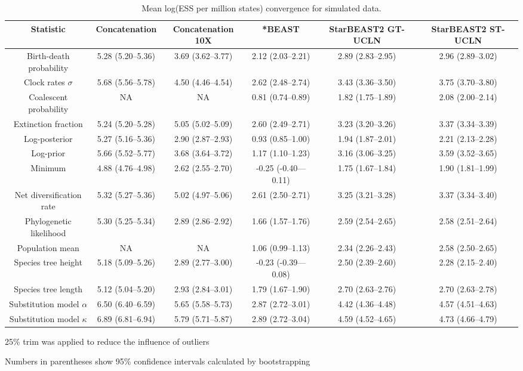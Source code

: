 \documentclass[12pt]{article}
\begin{document}
\begin{landscape}
\clearpage

\begin{table}[htb!]
\centering
\caption{Mean log(ESS per million states) convergence for simulated data.}
\label{tab:simulatedPerMstates}
\begin{threeparttable}
\begin{adjustbox}{center}
\renewcommand{\arraystretch}{1.2}
\footnotesize
\begin{tabular}{|c|c|c|c|c|c|}
\multicolumn{1}{c}{Statistic} & \multicolumn{1}{c}{Concatenation} & \multicolumn{1}{c}{Concatenation 10X} & \multicolumn{1}{c}{*BEAST} & \multicolumn{1}{c}{StarBEAST2 GT-UCLN} & \multicolumn{1}{c}{StarBEAST2 ST-UCLN}\tabularnewline
\hline
Birth-death probability & 5.28 (5.20--5.36) & 3.69 (3.62--3.77) & 2.12 (2.03--2.21) & 2.89 (2.83--2.95) & 2.96 (2.89--3.02)\tabularnewline
\hline
Clock rates $\sigma$ & 5.68 (5.56--5.78) & 4.50 (4.46--4.54) & 2.62 (2.48--2.74) & 3.43 (3.36--3.50) & 3.75 (3.70--3.80)\tabularnewline
\hline
Coalescent probability & NA & NA & 0.81 (0.74--0.89) & 1.82 (1.75--1.89) & 2.08 (2.00--2.14)\tabularnewline
\hline
Extinction fraction & 5.24 (5.20--5.28) & 5.05 (5.02--5.09) & 2.60 (2.49--2.71) & 3.23 (3.20--3.26) & 3.37 (3.34--3.39)\tabularnewline
\hline
Log-posterior & 5.27 (5.16--5.36) & 2.90 (2.87--2.93) & 0.93 (0.85--1.00) & 1.94 (1.87--2.01) & 2.21 (2.13--2.28)\tabularnewline
\hline
Log-prior & 5.66 (5.52--5.77) & 3.68 (3.64--3.72) & 1.17 (1.10--1.23) & 3.16 (3.06--3.25) & 3.59 (3.52--3.65)\tabularnewline
\hline
Minimum & 4.88 (4.76--4.98) & 2.62 (2.55--2.70) & -0.25 (-0.40---0.11) & 1.75 (1.67--1.84) & 1.90 (1.81--1.99)\tabularnewline
\hline
Net diversification rate & 5.32 (5.27--5.36) & 5.02 (4.97--5.06) & 2.61 (2.50--2.71) & 3.25 (3.21--3.28) & 3.37 (3.34--3.40)\tabularnewline
\hline
Phylogenetic likelihood & 5.30 (5.25--5.34) & 2.89 (2.86--2.92) & 1.66 (1.57--1.76) & 2.59 (2.54--2.65) & 2.58 (2.51--2.64)\tabularnewline
\hline
Population mean & NA & NA & 1.06 (0.99--1.13) & 2.34 (2.26--2.43) & 2.58 (2.50--2.65)\tabularnewline
\hline
Species tree height & 5.18 (5.09--5.26) & 2.89 (2.77--3.00) & -0.23 (-0.39---0.08) & 2.50 (2.39--2.60) & 2.28 (2.15--2.40)\tabularnewline
\hline
Species tree length & 5.12 (5.04--5.20) & 2.93 (2.84--3.01) & 1.79 (1.67--1.90) & 2.70 (2.63--2.76) & 2.70 (2.63--2.78)\tabularnewline
\hline
Substitution model $\alpha$ & 6.50 (6.40--6.59) & 5.65 (5.58--5.73) & 2.87 (2.72--3.01) & 4.42 (4.36--4.48) & 4.57 (4.51--4.63)\tabularnewline
\hline
Substitution model $\kappa$ & 6.89 (6.81--6.94) & 5.79 (5.71--5.87) & 2.89 (2.72--3.04) & 4.59 (4.52--4.65) & 4.73 (4.66--4.79)\tabularnewline
\hline
\end{tabular}
\end{adjustbox}
\begin{tablenotes}
\footnotesize
\item 25\% trim was applied to reduce the influence of outliers
\item Numbers in parentheses show 95\% confidence intervals calculated by bootstrapping
\end{tablenotes}
\end{threeparttable}
\end{table}


\end{landscape}
\end{document}

